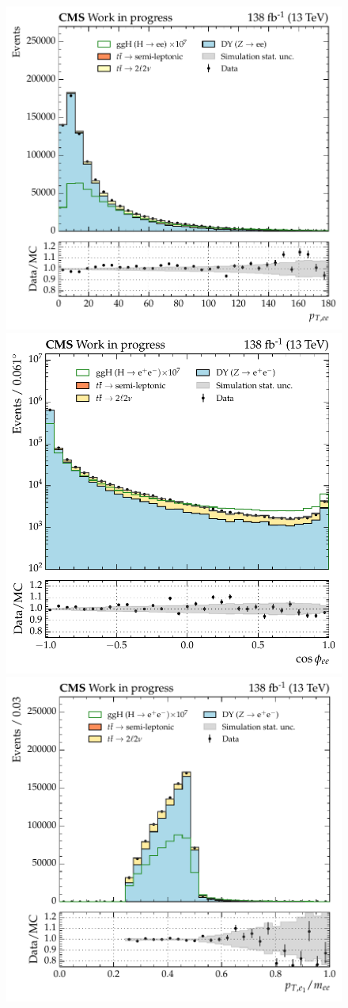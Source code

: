 \begin{figure}[htbp!]
\centering
\includegraphics[width =0.33\linewidth]{Figures/Hee/ggH/dataMC/all_inputs/ggH_BDT_pt_reweighted_dielectronPt.pdf}\hfill%
\includegraphics[width =0.32\linewidth]{Figures/Hee/ggH/dataMC/all_inputs/ggH_BDT_pt_reweighted_dielectronCosPhi.pdf}\hfill%
\includegraphics[width =0.33\linewidth]{Figures/Hee/ggH/dataMC/all_inputs/ggH_BDT_pt_reweighted_subleadElectronPtOvM.pdf}\hfill%
 

\end{figure}
